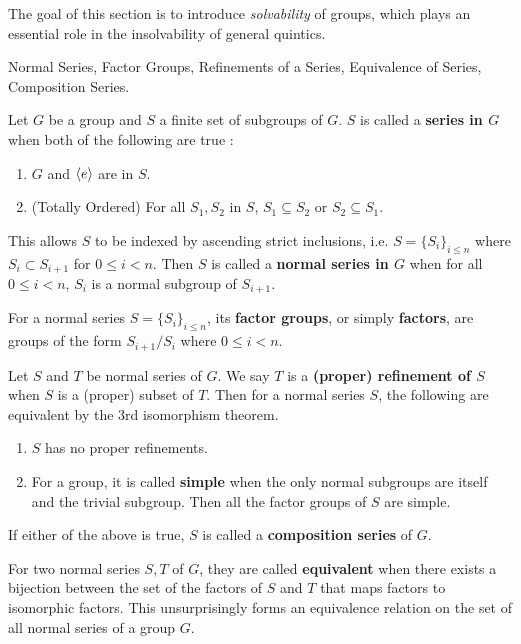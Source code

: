 \documentclass[../../book.tex]{subfiles}
\begin{document}
The goal of this section is to introduce \emph{solvability} of groups,
which plays an essential role in the insolvability of general quintics. 
\begin{dfn} Normal Series, Factor Groups, Refinements of a Series, 
Equivalence of Series, Composition Series.
    
    Let $G$ be a group and $S$ a finite set of subgroups of $G$.
    $S$ is called a \textbf{series in $G$} when both of the following are true : 
    \begin{enumerate}
        \item $G$ and $\langle e\rangle$ are in $S$.
        \item (Totally Ordered) 
        For all $S_1, S_2$ in $S$, $S_1 \subseteq S_2$ or $S_2 \subseteq S_1$. 
    \end{enumerate}
    This allows $S$ to be indexed by ascending strict inclusions, 
    i.e. $S = \{S_i\}_{i\leq n}$ where $S_i \subset S_{i+1}$ for $0 \leq i < n$.
    Then $S$ is called a \textbf{normal series in $G$} when 
    for all $0 \leq i < n$, $S_i$ is a normal subgroup of $S_{i+1}$. 
    
    For a normal series $S = \{S_i\}_{i\leq n}$, 
    its \textbf{factor groups}, or simply \textbf{factors},
    are groups of the form $S_{i+1}/S_i$ where $0\leq i < n$. 
    
    Let $S$ and $T$ be normal series of $G$. 
    We say $T$ is a \textbf{(proper) refinement of $S$} when
    $S$ is a (proper) subset of $T$. 
    Then for a normal series $S$, 
    the following are equivalent by the 3rd isomorphism theorem.
    \begin{enumerate}
        \item $S$ has no proper refinements.
        \item For a group, it is called \textbf{simple} when
        the only normal subgroups are itself and the trivial subgroup.
        Then all the factor groups of $S$ are simple. 
    \end{enumerate}
    If either of the above is true, 
    $S$ is called a \textbf{composition series} of $G$. 
    
    For two normal series $S, T$ of $G$, 
    they are called \textbf{equivalent} when 
    there exists a bijection between the set of the factors of $S$ and $T$
    that maps factors to isomorphic factors. 
    This unsurprisingly forms an equivalence relation 
    on the set of all normal series of a group $G$. 
    
\end{dfn}
\end{document}
